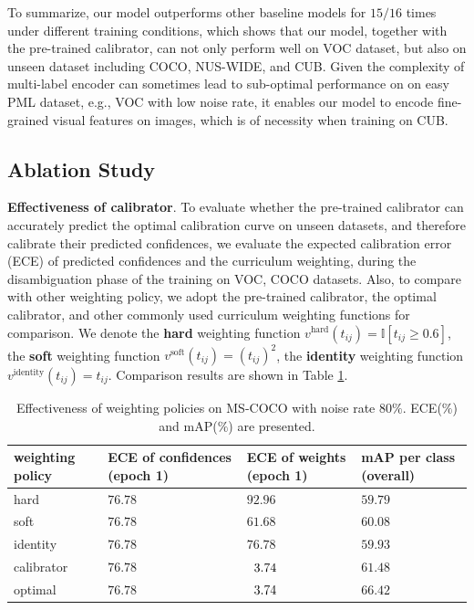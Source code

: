 \documentclass[letterpaper]{article} %
\begin{document}
  To summarize, our model outperforms other baseline models for $15/16$ times under different training conditions, which shows that our model, together with the pre-trained calibrator, can not only perform well on VOC dataset, but also on unseen dataset including COCO, NUS-WIDE, and CUB. Given the complexity of multi-label encoder can sometimes lead to sub-optimal performance on on easy PML dataset, e.g., VOC with low noise rate, it enables our model to encode fine-grained visual features on images, which is of necessity when training on CUB. 

\subsection{Ablation Study}

  \textbf{Effectiveness of calibrator}. To evaluate whether the pre-trained calibrator can accurately predict the optimal calibration curve on unseen datasets, and therefore calibrate their predicted confidences, we evaluate the expected calibration error (ECE) of predicted confidences and the curriculum weighting, during the disambiguation phase of the training on VOC, COCO datasets. Also, to compare with other weighting policy, we adopt the pre-trained calibrator, the optimal calibrator, and other commonly used curriculum weighting functions for comparison. We denote 
  the \textbf{hard} weighting function 
    $v^\text{hard}(t_{ij}) = \mathbb{I}[t_{ij} \geq 0.6]$, 
  the \textbf{soft} weighting function 
    $v^\text{soft}(t_{ij}) = (t_{ij})^{2}$,
  the \textbf{identity} weighting function 
    $v^\text{identity}(t_{ij}) = t_{ij}$.
  Comparison results are shown in Table \ref{tab:weighting}. 

  \begin{table}[htbp]
    \footnotesize
    \setlength\tabcolsep{5pt}
    \centering
    \begin{tabularx}{0.95\linewidth}{XXXX}
    \toprule
      weighting \newline policy & ECE of \newline confidences \newline  (epoch 1) & ECE of \newline weights \newline (epoch 1) & mAP \newline per class \newline (overall) \\
    \midrule
      hard        & $76.78$ & $92.96$ & $59.79$ \\
      soft        & $76.78$ & $61.68$ & $60.08$ \\
      identity    & $76.78$ & $76.78$ & $59.93$ \\
      calibrator  & $76.78$ & \cellcolor{gray!30}$\hphantom{0}3.74$ & \cellcolor{gray!30}$61.48$ \\
      optimal     & $76.78$ & \cellcolor{gray!50}$\hphantom{0}3.74$ & \cellcolor{gray!50}$66.42$ \\
    \bottomrule
    \end{tabularx}%
    \caption{Effectiveness of weighting policies on MS-COCO with noise rate $80\%$. ECE($\%$) and mAP($\%$) are presented. }
    \label{tab:weighting}%
  \end{table}
\end{document}
